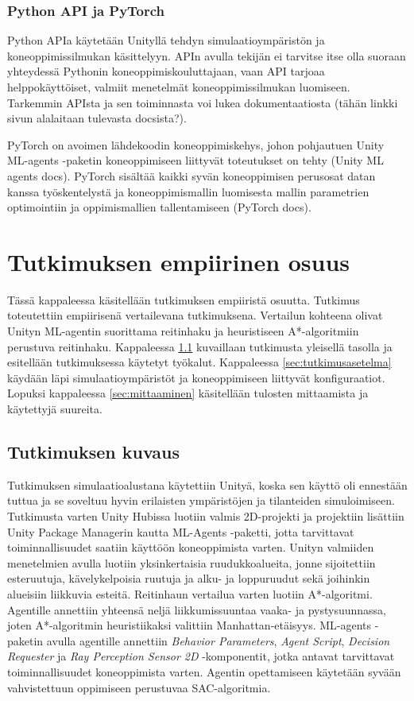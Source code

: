 \documentclass[utf8]{gradu3}
\begin{document}
\subsection{Python API ja PyTorch}

Python APIa käytetään Unityllä tehdyn simulaatioympäristön ja koneoppimissilmukan käsittelyyn. APIn avulla tekijän ei tarvitse itse olla suoraan yhteydessä Pythonin koneoppimiskouluttajaan, vaan API tarjoaa helppokäyttöiset, valmiit menetelmät koneoppimissilmukan luomiseen. Tarkemmin APIsta ja sen toiminnasta voi lukea dokumentaatiosta (tähän linkki sivun alalaitaan tulevasta docsista?).

PyTorch on avoimen lähdekoodin koneoppimiskehys, johon pohjautuen Unity ML-agents -paketin koneoppimiseen liittyvät toteutukset on tehty (Unity ML agents docs). PyTorch sisältää kaikki syvän koneoppimisen perusosat datan kanssa työskentelystä ja koneoppimismallin luomisesta mallin parametrien optimointiin ja oppimismallien tallentamiseen (PyTorch docs).

\chapter{Tutkimuksen empiirinen osuus}
\label{empiirinen}

Tässä kappaleessa käsitellään tutkimuksen empiiristä osuutta. Tutkimus toteutettiin empiirisenä vertailevana tutkimuksena. Vertailun kohteena olivat Unityn ML-agentin suorittama reitinhaku ja heuristiseen A*-algoritmiin perustuva reitinhaku. Kappaleessa \ref{sec:tutkimuksenkuvaus} kuvaillaan tutkimusta yleisellä tasolla ja esitellään tutkimuksessa käytetyt työkalut. Kappaleessa \ref{sec:tutkimusasetelma} käydään läpi simulaatioympäristöt ja koneoppimiseen liittyvät konfiguraatiot. Lopuksi kappaleessa \ref{sec:mittaaminen} käsitellään tulosten mittaamista ja käytettyjä suureita.

\section{Tutkimuksen kuvaus}
\label{sec:tutkimuksenkuvaus}

Tutkimuksen simulaatioalustana käytettiin Unityä, koska sen käyttö oli ennestään tuttua ja se soveltuu hyvin erilaisten ympäristöjen ja tilanteiden simuloimiseen. Tutkimusta varten Unity Hubissa luotiin valmis 2D-projekti ja projektiin lisättiin Unity Package Managerin kautta ML-Agents -paketti, jotta tarvittavat toiminnallisuudet saatiin käyttöön koneoppimista varten. Unityn valmiiden menetelmien avulla luotiin yksinkertaisia ruudukkoalueita, jonne sijoitettiin esteruutuja, kävelykelpoisia ruutuja ja alku- ja loppuruudut sekä joihinkin alueisiin liikkuvia esteitä. Reitinhaun vertailua varten luotiin A*-algoritmi. Agentille annettiin yhteensä neljä liikkumissuuntaa vaaka- ja pystysuunnassa, joten A*-algoritmin heuristiikaksi valittiin Manhattan-etäisyys. ML-agents -paketin avulla agentille annettiin \textit{Behavior Parameters}, \textit{Agent Script}, \textit{Decision Requester} ja \textit{Ray Perception Sensor 2D} -komponentit, jotka antavat tarvittavat toiminnallisuudet koneoppimista varten. Agentin opettamiseen käytetään syvään vahvistettuun oppimiseen perustuvaa SAC-algoritmia.
\end{document}

